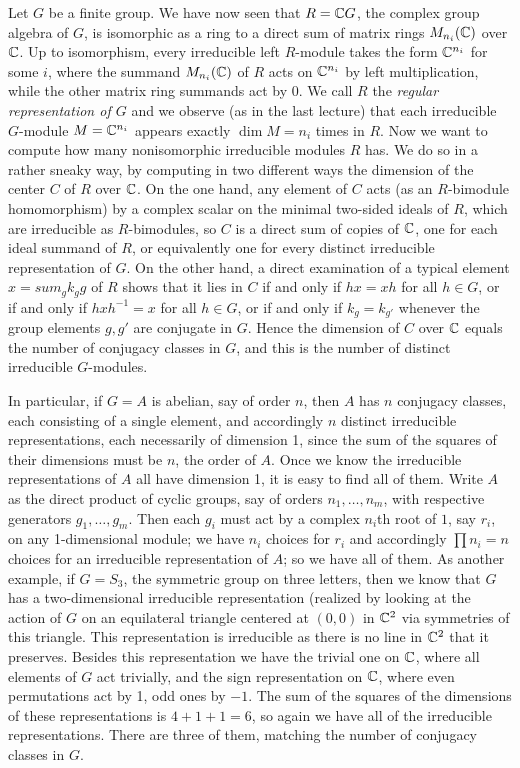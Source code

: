 Let $G$ be a finite group.  We have now seen that $R=\Bbb CG$, the complex group algebra of $G$, is isomorphic as a ring to a direct sum of matrix rings $M_{n_i}(\Bbb C)$ over $\Bbb C$.  Up to isomorphism, every irreducible left $R$-module takes the form $\Bbb C^{n_i}$ for some $i$, where the summand $M_{n_i}(\Bbb C)$ of $R$ acts on $\Bbb C^{n_i}$ by left multiplication, while the other matrix ring summands act by 0.  We call $R$ the {\sl regular representation of $G$} and we observe (as in the last lecture) that each irreducible $G$-module $M=\Bbb C^{n_i}$ appears exactly
$\dim M = n_i$ times in $R$.  Now we want to compute how many nonisomorphic irreducible modules $R$ has.  We do so in a rather sneaky way, by computing in two different ways the dimension of the center $C$ of $R$ over $\Bbb C$.  On the one hand, any element of $C$ acts (as an $R$-bimodule homomorphism) by a complex scalar on the minimal two-sided ideals of $R$, which are irreducible as $R$-bimodules, so $C$ is a direct sum of copies of $\Bbb C$, one for each ideal summand of $R$, or equivalently one for every distinct irreducible representation of $G$.  On the other hand, a direct examination of a typical element $x=sum_g k_g g$ of $R$ shows that it lies in $C$ if and only if
$hx = xh$ for all $h\in G$, or if and only if $hxh^{-1} = x$ for all $h\in G$, or if and only if
$k_g = k_{g'}$ whenever the group elements $g,g'$ are conjugate in $G$.  Hence the dimension of $C$ over $\Bbb C$ equals the number of conjugacy classes in $G$, and this is the number of distinct irreducible $G$-modules.

In particular, if $G=A$ is abelian, say of order $n$, then $A$ has $n$ conjugacy classes, each consisting of a single element, and accordingly $n$ distinct irreducible representations, each necessarily of dimension 1, since the sum of the squares of their dimensions must be $n$, the order of $A$.  Once we know the irreducible representations of $A$ all have dimension 1, it is easy to find all of them.  Write $A$ as the direct product of cyclic groups, say of orders $n_1,\ldots,n_m$, with respective generators $g_1,\ldots,g_m$.  Then each $g_i$ must act by a complex $n_i$th root of $1$, say $r_i$, on any 1-dimensional module; we have $n_i$ choices for $r_i$ and accordingly
$\prod n_i = n$ choices for an irreducible representation of $A$; so we have all of them.  As another example, if $G=S_3$, the symmetric group on three letters, then we know that $G$ has a two-dimensional irreducible representation (realized by looking at the action of $G$ on an equilateral triangle centered at $(0,0)$ in $\Bbb C^2$ via symmetries of this triangle.  This representation is irreducible as there is no line in $\Bbb C^2$ that it preserves.  Besides this representation we have the trivial one on $\Bbb C$, where all elements of $G$ act trivially, and the sign representation on
$\Bbb C$, where even permutations act by 1, odd ones by $-1$.  The sum of the squares of the dimensions of these representations is $4+1+1= 6$, so again we have all of the irreducible representations.  There are three of them, matching the number of conjugacy classes in $G$.

